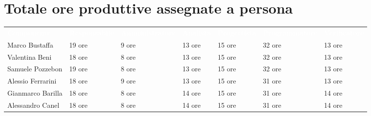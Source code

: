\section{Totale ore produttive assegnate a persona}
{\renewcommand{\arraystretch}{1.5}
\scriptsize
\begin{tabular}{p{2.5cm}p{2cm}p{2.3cm}p{1.3cm}p{2cm}p{2.3cm}p{1.8cm}}
	\rowcolor[RGB]{33, 73, 50}
	\textcolor{white}{\textbf{Componente}} & \textcolor{white}{\textbf{Responsabile}} & \textcolor{white}
	{\textbf{Amministratore}} & \textcolor{white}{\textbf{Analista}} & \textcolor{white}
	{\textbf{Progettista}} & \textcolor{white}{\textbf{Programmatore}} & \textcolor{white}{\textbf{Verificatore}}\\
	\rowcolor[RGB]{216, 235, 171}
	Marco Bustaffa & 19 ore & 9 ore & 13 ore & 15 ore & 32 ore & 13 ore        	\\
	\rowcolor[RGB]{233, 245, 206}
	Valentina Beni & 18 ore & 8 ore & 13 ore & 15 ore & 32 ore & 13 ore        	\\
	\rowcolor[RGB]{216, 235, 171}
	Samuele Pozzebon & 19 ore & 8 ore & 13 ore & 15 ore & 32 ore & 13 ore      	\\
    \rowcolor[RGB]{233, 245, 206}
	Alessio Ferrarini & 18 ore & 9 ore & 13 ore & 15 ore & 31 ore & 13 ore     	\\
    \rowcolor[RGB]{216, 235, 171}
	Gianmarco Barilla & 18 ore & 8 ore & 14 ore & 15 ore & 31 ore & 14 ore     	\\
    \rowcolor[RGB]{233, 245, 206}
	Alessandro Canel & 18 ore & 8 ore & 14 ore & 15 ore & 31 ore & 14 ore    	\\
\end{tabular}	
}